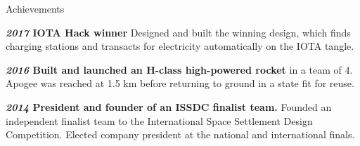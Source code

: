 \documentclass[10pt]{resume} %
\begin{document}
\begin{rSection}{Achievements}
    \item \textbf{\textit{2017} IOTA Hack winner}
    Designed and built the winning design, which finds charging stations and
    transacts for electricity automatically on the IOTA tangle.
    \item \textbf{\textit{2016} Built and launched an H-class high-powered
      rocket} in a team of 4. Apogee was reached at 1.5 km before returning to
      ground in a state fit for reuse.
    \item \textbf{\textit{2014} President and founder of an ISSDC finalist
      team.}
    Founded an independent finalist team to the International Space Settlement
    Design Competition. Elected company president at the national and
    international finals.
\end{rSection}

\end{document}
